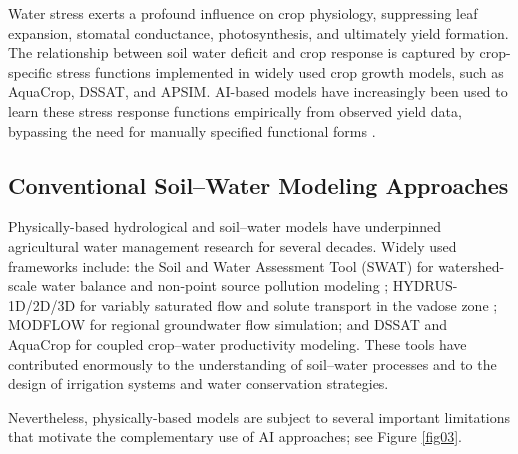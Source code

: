 \documentclass[land,review,accept,pdftex,oneauthor]{Definitions/mdpi}
\begin{document}
Water stress exerts a profound influence on crop physiology, suppressing leaf expansion, stomatal conductance, photosynthesis, and ultimately yield formation. The relationship between soil water deficit and crop response is captured by crop-specific stress functions implemented in widely used crop growth models, such as AquaCrop, DSSAT, and APSIM. AI-based models have increasingly been used to learn these stress response functions empirically from observed yield data, bypassing the need for manually specified functional forms \citep{van2019machine}.

\subsection{Conventional Soil--Water Modeling Approaches}

Physically-based hydrological and soil--water models have underpinned agricultural water management research for several decades. Widely used frameworks include: the Soil and Water Assessment Tool (SWAT) for watershed-scale water balance and non-point source pollution modeling \citep{Arnold1998,Fatichi2016}; HYDRUS-1D/2D/3D for variably saturated flow and solute transport in the vadose zone \citep{simunek2008hydrus}; MODFLOW for regional groundwater flow simulation; and DSSAT and AquaCrop for coupled crop--water productivity modeling. These tools have contributed enormously to the understanding of soil--water processes and to the design of irrigation systems and water conservation strategies.

Nevertheless, physically-based models are subject to several important limitations that motivate the complementary use of AI approaches; see Figure \ref{fig03}. 
\end{document}
